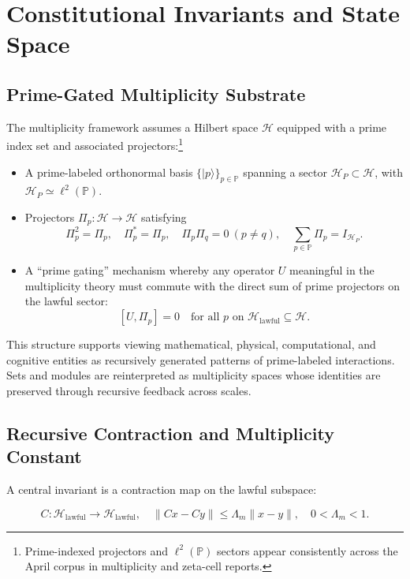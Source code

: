 \documentclass[11pt]{article}
\begin{document}
\tableofcontents


\section{Constitutional Invariants and State Space}

\subsection{Prime-Gated Multiplicity Substrate}

The multiplicity framework assumes a Hilbert space \(\mathcal{H}\) equipped with a prime index set and associated projectors:\footnote{Prime-indexed projectors and \(\ell^2(\mathbb{P})\) sectors appear consistently across the April corpus in multiplicity and zeta-cell reports.}

\begin{itemize}[leftmargin=*]
  \item A prime-labeled orthonormal basis \(\{ \lvert p \rangle \}_{p \in \mathbb{P}}\) spanning a sector \(\mathcal{H}_P\subset \mathcal{H}\), with \(\mathcal{H}_P \simeq \ell^2(\mathbb{P})\).
  \item Projectors \(\Pi_p: \mathcal{H} \to \mathcal{H}\) satisfying
  \[
  \Pi_p^2 = \Pi_p,\quad \Pi_p^\ast = \Pi_p,\quad \Pi_p \Pi_q = 0 \ (p \neq q),\quad \sum_{p \in \mathbb{P}} \Pi_p = I_{\mathcal{H}_P}.
  \]
  \item A ``prime gating'' mechanism whereby any operator \(U\) meaningful in the multiplicity theory must commute with the direct sum of prime projectors on the lawful sector:
  \[
  [U, \Pi_p] = 0 \quad \text{for all } p \text{ on } \mathcal{H}_\text{lawful} \subseteq \mathcal{H}.
  \]
\end{itemize}

This structure supports viewing mathematical, physical, computational, and cognitive entities as recursively generated patterns of prime-labeled interactions. Sets and modules are reinterpreted as multiplicity spaces whose identities are preserved through recursive feedback across scales.

\subsection{Recursive Contraction and Multiplicity Constant}

A central invariant is a contraction map on the lawful subspace:

\[
C: \mathcal{H}_\text{lawful} \to \mathcal{H}_\text{lawful}, \quad \| C x - C y \| \leq \Lambda_m \| x - y \|,\quad 0 < \Lambda_m < 1.
\]
\end{document}
